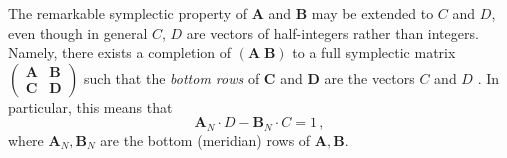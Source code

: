\documentclass[12pt]{amsart}
\newcommand{\lbl}{\label}
\renewcommand{\eta}{\nu}
\theoremstyle{definition}
\def\BC{\mathbb C}
\def\SL{\mathrm{SL}}
\def\PSL{\mathrm{PSL}}
\def\be{  \begin{equation} }
\def\ee{  \end{equation} }
\newcommand{\cf}{\emph{cf.}}
\newcommand{\mb}{\mathbf}
\numberwithin{equation}{section}
\begin{document}
The remarkable symplectic property of $\mb A$ and $\mb B$ may be extended to $C$ and $D$, even though in general $C$, $D$ are vectors of 
half-integers rather than integers.
Namely, there exists a completion of $(\mb A\;\mb B)$ to a full symplectic matrix $\left(\begin{smallmatrix}\mb A & \mb B \\ \mb C & \mb D\end{smallmatrix}\right)$ such that the \emph{bottom rows} of $\mb C$ and $\mb D$ are the vectors $C$ and $D$ \cite{NZ}. In particular, this means that
%
\be \mb A_N\cdot D-\mb B_N\cdot C = 1\,, \ee
%
where $\mb A_N,\mb B_N$ are the bottom (meridian) rows of $\mb A,\mb B$.



\end{document}
